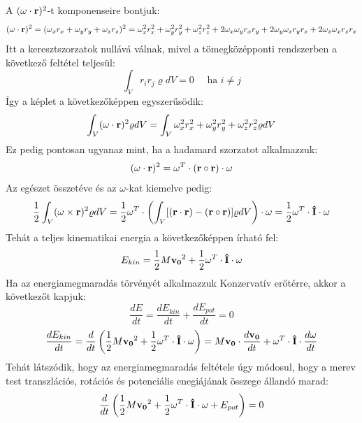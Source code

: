 \documentclass[../main.tex]{subfiles}
\begin{document}
A $(\bold{\omega} \cdot \bold{r})^2$-t komponenseire bontjuk:
\begin{equation}
    (\bold{\omega} \cdot \bold{r})^2 = (\omega_x r_x + \omega_y r_y + \omega_z r_z)^2 = \omega_x^2 r_x^2 + \omega_y^2 r_y^2 + \omega_z^2 r_z^2 + 2 \omega_x \omega_y r_x r_y + 2 \omega_y \omega_z r_y r_z + 2 \omega_z \omega_x r_z r_x
\end{equation}
Itt a keresztszorzatok nullává válnak, mivel a tömegközépponti rendszerben a következő feltétel teljesül:
\begin{equation}
    \int_{V} r_i r_j \varrho dV = 0 \quad \text{ ha } i \neq j
\end{equation}
Így a képlet a következőképpen egyszerűsödik:
\begin{equation}
    \int_{V} (\bold{\omega} \cdot \bold{r})^2 \varrho dV = \int_{V}\omega_x^2 r_x^2 + \omega_y^2 r_y^2 + \omega_z^2 r_z^2 \varrho dV
\end{equation}
Ez pedig pontosan ugyanaz mint, ha a hadamard szorzatot alkalmazzuk:
\begin{equation}
    (\bold{\omega} \cdot \bold{r})^2 = \omega^T \cdot (\bold{r} \circ \bold{r}) \cdot \omega
\end{equation}
Az egészet összetéve és az $\omega$-kat kiemelve pedig:
\begin{equation}
    \frac{1}{2} \int_{V} (\bold{\omega} \times \bold{r})^2 \varrho dV = \frac{1}{2} \omega^T \cdot \left(\int_{V} [(\bold{r} \cdot \bold{r}) - (\bold{r} \circ \bold{r})] \varrho dV\right) \cdot \omega = \frac{1}{2} \omega^T \cdot \bold{\hat{I}} \cdot \omega
\end{equation}
Tehát a teljes kinematikai energia a következőképpen írható fel:
\begin{equation}    
    E_{kin} = \frac{1}{2} M \bold{v_0}^2 + \frac{1}{2} \bold{\omega}^T \cdot \bold{\hat{I}} \cdot \bold{\omega}
\end{equation}
Ha az energiamegmaradás törvényét alkalmazzuk Konzervatív erőtérre, akkor a következőt kapjuk:
\begin{equation}
    \frac{dE}{dt} = \frac{dE_{kin}}{dt} + \frac{dE_{pot}}{dt} = 0
\end{equation}
\begin{equation}
    \frac{dE_{kin}}{dt} = \frac{d}{dt} \left(\frac{1}{2} M \bold{v_0}^2 + \frac{1}{2} \bold{\omega}^T \cdot \bold{\hat{I}} \cdot \bold{\omega}\right) = M \bold{v_0} \cdot \frac{d\bold{v_0}}{dt} + \bold{\omega}^T \cdot \bold{\hat{I}} \cdot \frac{d\bold{\omega}}{dt}
\end{equation}
Tehát látszódik, hogy az energiamegmaradás feltétele úgy módosul, hogy a merev test transzlációs, rotációs és potenciális enegiájának összege állandó marad:
\begin{equation}
    \frac{d}{dt} \left(\frac{1}{2} M \bold{v_0}^2 + \frac{1}{2} \bold{\omega}^T \cdot \bold{\hat{I}} \cdot \bold{\omega} + E_{pot}\right) = 0
\end{equation}
\end{document}
